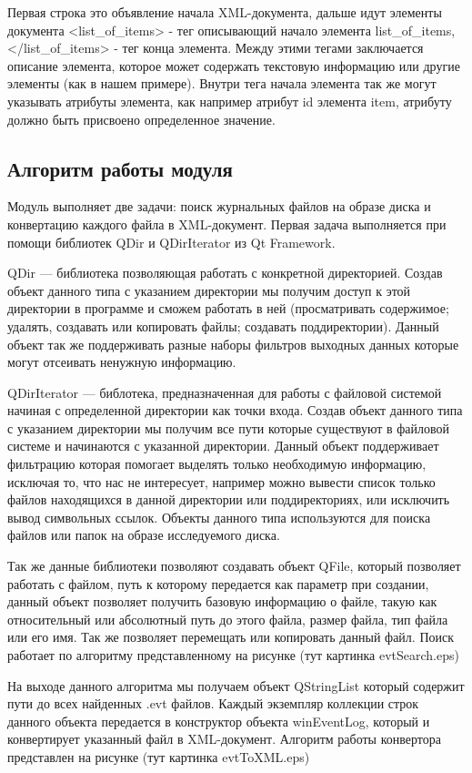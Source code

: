 Первая строка это объявление начала XML-документа, дальше идут элементы документа <list_of_items> - тег описывающий начало элемента list_of_items, </list_of_items> - тег конца элемента. Между этими тегами заключается описание элемента, которое может содержать текстовую информацию или другие элементы (как в нашем примере). Внутри тега начала элемента так же могут указывать атрибуты элемента, как например атрибут id элемента item, атрибуту должно быть присвоено определенное значение. 

\subsection{Алгоритм работы модуля}

Модуль выполняет две задачи: поиск журнальных файлов на образе диска и конвертацию каждого файла в XML-документ. Первая задача выполняется при помощи библиотек QDir и QDirIterator из Qt Framework.

QDir — библиотека позволяющая работать с конкретной директорией. Создав объект данного типа с указанием директории мы получим доступ к этой директории в программе и сможем работать в ней (просматривать содержимое; удалять, создавать или копировать файлы; создавать поддиректории). Данный объект так же поддерживать разные наборы фильтров выходных данных которые могут отсеивать ненужную информацию. 

QDirIterator — библотека, предназначенная для работы с файловой системой начиная с определенной директории как точки входа. Создав объект данного типа с указанием директории мы получим все пути которые существуют в файловой системе и начинаются с указанной директории. Данный объект поддерживает фильтрацию которая помогает выделять только необходимую информацию, исключая то, что нас не интересует, например можно вывести список только файлов находящихся в данной директории или поддиректориях, или исключить вывод символьных ссылок. Объекты данного типа используются для поиска файлов или папок на образе исследуемого диска. 

Так же данные библиотеки позволяют создавать объект QFile, который позволяет работать с файлом, путь к которому передается как параметр при создании, данный объект позволяет получить базовую информацию о файле, такую как относительный или абсолютный путь до этого файла, размер файла, тип файла или его имя. Так же позволяет перемещать или копировать данный файл. Поиск работает по алгоритму представленному на рисунке (тут картинка evtSearch.eps) 

На выходе данного алгоритма мы получаем объект QStringList который содержит пути до всех найденных .evt файлов. Каждый экземпляр коллекции строк данного объекта передается в конструктор объекта winEventLog, который и конвертирует указанный файл в XML-документ. Алгоритм работы конвертора представлен на рисунке (тут картинка evtToXML.eps) 

